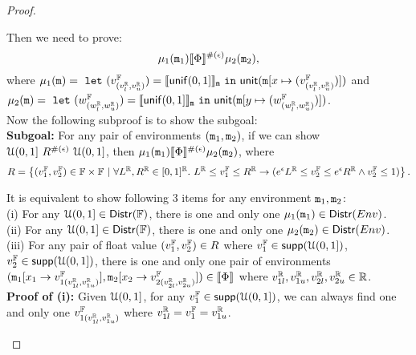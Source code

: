 \documentclass[a4paper,11pt]{article}
\begin{document}
\begin{proof}
\begin{itemize}
	Then we need to prove:
	\[\mu_1(\mathtt{m}_1) \llbracket \Phi \rrbracket^{\#(\epsilon)} \mu_2(\mathtt{m}_2),\]
	where 
	$\mu_1(\mathtt{m}) = 
	~\mathtt{let}~ (v^{\mathbb{F}}_{(v^{\mathbb{R}}_{l}, v^{\mathbb{R}}_{u})}) 
	= \llbracket \mathsf{unif}(0, 1] \rrbracket_{\mathtt{m}} 
	~\mathtt{in}~ 
	\mathsf{unit}(\mathtt{m}[x \mapsto (v^{\mathbb{F}}_{(v^{\mathbb{R}}_{l}, v^{\mathbb{R}}_{u})})])$ and
	\\
	$\mu_2(\mathtt{m}) = 
	~\mathtt{let}~ (w^{\mathbb{F}}_{(w^{\mathbb{R}}_{l}, w^{\mathbb{R}}_{u})})
	= \llbracket \mathsf{unif}(0, 1] \rrbracket_{\mathtt{m}} 
	~\mathtt{in}~ 
	\mathsf{unit}(\mathtt{m}[y \mapsto (w^{\mathbb{F}}_{(w^{\mathbb{R}}_{l}, w^{\mathbb{R}}_{u})})])$.
	\\
	Now the following subproof is to show the subgoal:
	\\
	\textbf{Subgoal:} For any pair of environments $(\mathtt{m}_1, \mathtt{m}_2)$, if we can show ${\mathcal{U}(0,1]} ~ R^{\#(\epsilon)} ~ {\mathcal{U}(0,1]}$, then $\mu_1(\mathtt{m}_1) \llbracket \Phi \rrbracket^{\#(\epsilon)} \mu_2(\mathtt{m}_2)$,
	where
	\[
		R = 
		\left \{(v^{\mathbb{F}}_1, v^{\mathbb{F}}_2) \in \mathbb{F} \times \mathbb{F} 
		~\vert~
		\forall L^{\mathbb{R}}, R^{\mathbb{R}} \in [0,1]^{\mathbb{R}}. ~
		L^{\mathbb{R}} \leq v^{\mathbb{F}}_1 \leq R^{\mathbb{R}}
		\rightarrow
		(e^{\epsilon} L^{\mathbb{R}} \leq v^{\mathbb{F}}_2 \leq 	e^{\epsilon} R^{\mathbb{R}}
		\land v^{\mathbb{F}}_2 \leq 1)
		\right \}.
	\]	%
	\begin{subproof}
	It is equivalent to show following 3 items for any environment $\mathtt{m}_1, \mathtt{m}_2$:
	\\
	(i) For any $\mathcal{U}(0,1]\in \mathsf{Distr}(\mathbb{F})$, there is one and only one $\mu_1(\mathtt{m}_1) \in \mathsf{Distr}(Env)$.
	\\
	(ii) For any $\mathcal{U}(0,1] \in \mathsf{Distr}(\mathbb{F})$, there is one and only one $\mu_2(\mathtt{m}_2) \in \mathsf{Distr}(Env)$.
	\\
	(iii) For any pair of float value $(v^{\mathbb{F}}_1, v^{\mathbb{F}}_2) \in R$ where 
	$v^{\mathbb{F}}_1 \in \mathsf{supp}(\mathcal{U}(0,1])$, 
	$v^{\mathbb{F}}_2 \in \mathsf{supp}(\mathcal{U}(0,1])$,
	there is one and only one pair of environments 
	$(\mathtt{m}_1[ x_1 \to v^{\mathbb{F}}_{1(v^{\mathbb{R}}_{1l}, v^{\mathbb{R}}_{1u})}], \mathtt{m}_2[x_2 \to v^{\mathbb{F}}_{2(v^{\mathbb{R}}_{2l}, v^{\mathbb{R}}_{2u})}]) \in \llbracket \Phi \rrbracket$
	where $v^{\mathbb{R}}_{1l}, v^{\mathbb{R}}_{1u}, v^{\mathbb{R}}_{2l}, v^{\mathbb{R}}_{2u} \in \mathbb{R}$.
	\\ 
	\textbf{Proof of (i):} 
	Given $\mathcal{U}(0,1]$, for any $v^{\mathbb{F}}_1 \in \mathsf{supp}(\mathcal{U}(0,1])$, 
	we can always find one and only one $v^{\mathbb{F}}_{1(v^{\mathbb{R}}_{1l}, v^{\mathbb{R}}_{1u})}$ where $v^{\mathbb{R}}_{1l} = v^{\mathbb{F}}_1 = v^{\mathbb{R}}_{1u}$.

\end{subproof}
\end{itemize}
\end{proof}
\end{document}
